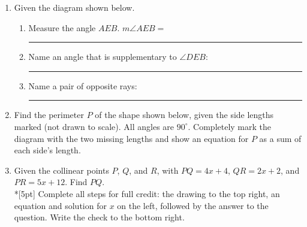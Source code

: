 \documentclass[12pt, twoside]{article}
\begin{document}
\begin{enumerate}
  \item Given the diagram shown below. \vspace{0.25cm}
  \begin{enumerate}
    \item  Measure the angle $AEB$. $m \angle AEB = $ \rule{4cm}{0.15mm} \bigskip
    \item Name an angle that is supplementary to $\angle DEB$: \rule{4cm}{0.15mm} \bigskip
    \item Name a pair of opposite rays: \rule{4cm}{0.15mm}
  \end{enumerate}
  \vspace{1cm}
  \begin{center}
  \end{center}
  
   \newpage 

   \item Find the perimeter $P$ of the shape shown below, given the side lengths marked (not drawn to scale). All angles are $90^\circ$. Completely mark the diagram with the two missing lengths and show an equation for $P$ as a sum of each side's length.
   \vspace{1cm} 
   \begin{flushleft}
   \end{flushleft} \vspace{2cm}

   \item Given the collinear points $P$, $Q$, and $R$, with $PQ=4x+4$, $QR=2x+2$, and $PR=5x+12$. Find ${PQ}$.\\*[5pt]
   Complete all steps for full credit: the drawing to the top right, an equation and solution for $x$ on the left, followed by the answer to the question. Write the check to the bottom right.
\vspace{4cm}

  \end{enumerate}
\end{document}
